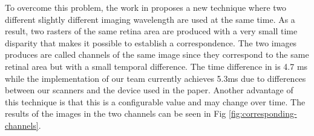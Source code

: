 \documentclass[]{article}
\begin{document}
To overcome this problem, the work in \cite{castro_rapid_2016} proposes a new technique where two different slightly different imaging wavelength are used at the same time.
As a result, two rasters of the same retina area are produced with a very small time disparity
that makes it possible to establish a correspondence.
The two images produces are called channels of the same image since they correspond to the same
retinal area but with a small temporal difference.
The time difference in \cite{castro_rapid_2016} is  4.7 ms while the implementation of our team
currently achieves 5.3ms due to differences between our scanners and the device used in the paper.
Another advantage of this technique is that this is a configurable value and may change over time.
The results of the images in the two channels can be seen in Fig \ref{fig:corresponding-channels}.
\end{document}
